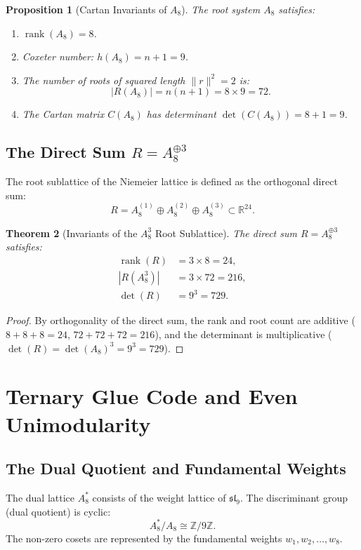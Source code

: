 \documentclass[11pt,a4paper]{article}
\newtheorem{theorem}{Theorem}
\newtheorem{proposition}[theorem]{Proposition}
\begin{document}
\begin{proposition}[Cartan Invariants of $A_8$]
The root system $A_8$ satisfies:
\begin{enumerate}
    \item $\operatorname{rank}(A_8) = 8$.
    \item Coxeter number: $h(A_8) = n + 1 = 9$.
    \item The number of roots of squared length $\|r\|^2 = 2$ is:
    \begin{equation}
    |R(A_8)| = n(n + 1) = 8 \times 9 = 72.
    \end{equation}
    \item The Cartan matrix $C(A_8)$ has determinant $\det(C(A_8)) = 8 + 1 = 9$.
\end{enumerate}
\end{proposition}

\subsection{The Direct Sum $R = A_8^{\oplus 3}$}
The root sublattice of the Niemeier lattice is defined as the orthogonal direct sum:
\begin{equation}
R = A_8^{(1)} \oplus A_8^{(2)} \oplus A_8^{(3)} \subset \mathbb{R}^{24}.
\end{equation}

\begin{theorem}[Invariants of the $A_8^3$ Root Sublattice]
The direct sum $R = A_8^{\oplus 3}$ satisfies:
\begin{align}
\operatorname{rank}(R) &= 3 \times 8 = 24, \\
|R(A_8^3)| &= 3 \times 72 = 216, \\
\det(R) &= 9^3 = 729.
\end{align}
\end{theorem}
\begin{proof}
By orthogonality of the direct sum, the rank and root count are additive ($8 + 8 + 8 = 24$, $72 + 72 + 72 = 216$), and the determinant is multiplicative ($\det(R) = \det(A_8)^3 = 9^3 = 729$).
\end{proof}

\section{Ternary Glue Code and Even Unimodularity}

\subsection{The Dual Quotient and Fundamental Weights}
The dual lattice $A_8^*$ consists of the weight lattice of $\mathfrak{sl}_9$. The discriminant group (dual quotient) is cyclic:
\begin{equation}
A_8^* / A_8 \cong \mathbb{Z} / 9\mathbb{Z}.
\end{equation}
The non-zero cosets are represented by the fundamental weights $w_1, w_2, \dots, w_8$.
\end{document}
